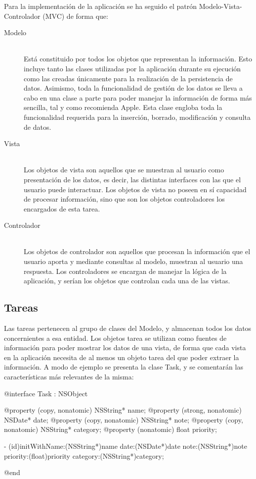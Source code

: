 \documentclass[parskip=half*]{scrartcl}
\begin{document}
Para la implementaci\'on de la aplicaci\'on se ha seguido el patr\'on Modelo-Vista-Controlador (MVC) de forma que:
\begin{description}
	\item[Modelo] \hfill \\ Est\'a constituido por todos los objetos que representan la informaci\'on. Esto incluye tanto las clases utilizadas por la aplicaci\'on durante su ejecuci\'on como las creadas \'unicamente para la realizaci\'on de la persistencia de datos. Asimismo, toda la funcionalidad de gesti\'on de los datos se lleva a cabo en una clase a parte para poder manejar la informaci\'on de forma m\'as sencilla, tal y como recomienda Apple. Esta clase engloba toda la funcionalidad requerida para la inserci\'on, borrado, modificaci\'on y consulta de datos.
	\item[Vista] \hfill \\ Los objetos de vista son aquellos que se muestran al usuario como presentaci\'on de los datos, es decir, las distintas interfaces con las que el usuario puede interactuar. Los objetos de vista no poseen en s\'i capacidad de procesar informaci\'on, sino que son los objetos controladores los encargados de esta tarea.
	\item[Controlador] \hfill \\ Los objetos de controlador son aquellos que procesan la informaci\'on que el usuario aporta y mediante consultas al modelo, muestran al usuario una respuesta. Los controladores se encargan de manejar la l\'ogica de la aplicaci\'on, y ser\'ian los objetos que controlan cada una de las vistas.
\end{description}

\subsection{Tareas}

Las tareas pertenecen al grupo de clases del Modelo, y almacenan todos los datos concernientes a esa entidad. Los objetos tarea se utilizan como fuentes de informaci\'on para poder mostrar los datos de una vista, de forma que cada vista en la aplicaci\'on necesita de al menos un objeto tarea del que poder extraer la informaci\'on. A modo de ejemplo se presenta la clase Task, y se comentar\'an las caracter\'isticas m\'as relevantes de la misma:

\begin{verbatimtab}
@interface Task : NSObject

@property (copy, nonatomic) NSString* name;
@property (strong, nonatomic) NSDate* date;
@property (copy, nonatomic) NSString* note;
@property (copy, nonatomic) NSString* category;
@property (nonatomic) float priority;

- (id)initWithName:(NSString*)name date:(NSDate*)date 
note:(NSString*)note priority:(float)priority category:(NSString*)category;

@end
\end{verbatimtab}
\end{document}
